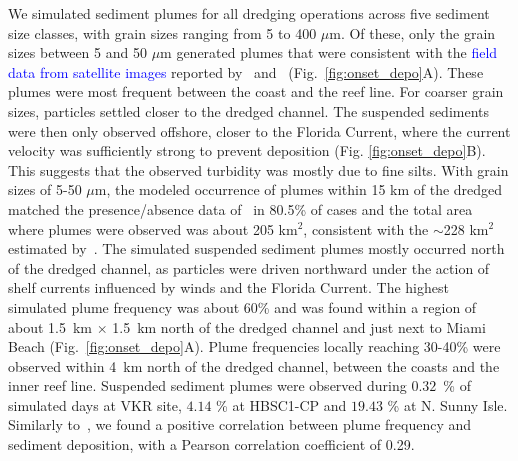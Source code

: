 \documentclass[preprint,12pt,authoryear]{elsarticle}
\newcommand{\modif}[1]{\textcolor{blue}{#1}}
\begin{document}
We simulated sediment plumes for all dredging operations across five sediment size classes, with grain sizes ranging from 5 to 400 $\mu$m. Of these, only the grain sizes between 5 and 50 $\mu$m generated plumes that were consistent with the \modif{field data from satellite images} reported by~\cite{barnes2015sediment} and~\cite{cunning2019extensive} (Fig.~\ref{fig:onset_depo}A). These plumes were most frequent between the coast and the reef line. For coarser grain sizes, particles settled closer to the dredged channel. The suspended sediments were then only observed offshore, closer to the Florida Current, where the current velocity was sufficiently strong to prevent deposition (Fig. \ref{fig:onset_depo}B). This suggests that the observed turbidity was mostly due to fine silts. With grain sizes of 5-50 $\mu$m, the modeled occurrence of plumes  within 15 km of the dredged matched the presence/absence data of~\cite{cunning2019extensive} in 80.5\% of cases and the total area where plumes were observed was about 205 km$^2$, consistent with the $\sim$228 km$^2$ estimated by~\cite{barnes2015sediment}. The simulated suspended sediment plumes mostly occurred north of the dredged channel, as particles were driven northward under the action of shelf currents influenced by winds and the Florida Current. The highest simulated plume frequency was about 60\% and was found within a region of about 1.5~km $\times$ 1.5~km north of the dredged channel and just next to Miami Beach (Fig.~\ref{fig:onset_depo}A). Plume frequencies locally reaching 30-40\% were observed within 4~km north of the dredged channel, between the coasts and the inner reef line. Suspended sediment plumes were observed during $0.32$~\% of simulated days at VKR site, $4.14$ \% at HBSC1-CP and $19.43$ \% at N. Sunny Isle. Similarly to~\cite{cunning2019extensive}, we found a positive correlation between plume frequency and sediment deposition, with a Pearson correlation coefficient of 0.29.

\end{document}
